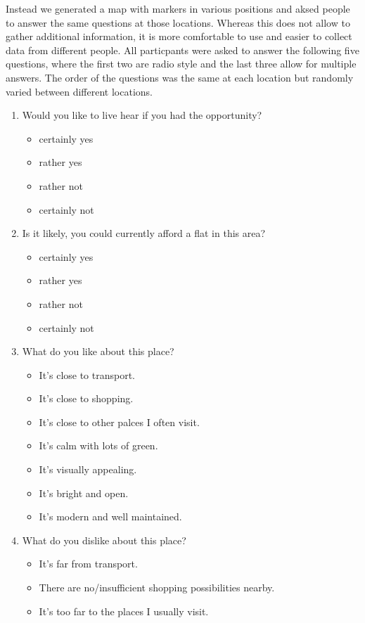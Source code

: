 \documentclass[letterpaper]{article}
\begin{document}
Instead we generated a map with markers in various positions and aksed people to answer the same questions at those locations. Whereas this does not allow to gather additional information, it is more comfortable to use and easier to collect data from different people. All particpants were asked to answer the following five questions, where the first two are radio style and the last three allow for multiple answers. The order of the questions was the same at each location but randomly varied between different locations.
\begin{enumerate}
	\item Would you like to live hear if you had the opportunity?
	\begin{itemize}
		\item certainly yes
		\item rather yes
		\item rather not
		\item certainly not
	\end{itemize}
	\item Is it likely, you could currently afford a flat in this area?
	\begin{itemize}
		\item certainly yes
		\item rather yes
		\item rather not
		\item certainly not
	\end{itemize}
	\item What do you like about this place?
	\begin{itemize}
		\item It's close to transport.
		\item It's close to shopping.
		\item It's close to other palces I often visit.
		\item It's calm with lots of green.
		\item It's visually appealing.
		\item It's bright and open.
		\item It's modern and well maintained.
	\end{itemize}
	\item What do you dislike about this place?
	\begin{itemize}
		\item It's far from transport.
		\item There are no/insufficient shopping possibilities nearby.
		\item It's too far to the places I usually visit.

\end{itemize}
\end{enumerate}
\end{document}
